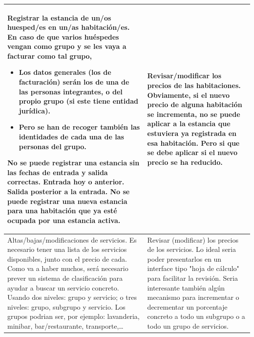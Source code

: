 \documentclass[spanish,12pt,a4paper,final,oneside]{book}
\begin{document}
\begin{longtable}{|p{7cm}|p{7cm}|}
\\ \hline

Registrar la estancia de un/os huesped/es en un/as habitación/es. 
\newline \newline
En caso de que varios huéspedes vengan como grupo y se les vaya a facturar como tal grupo,
\begin{itemize}
\item Los datos generales (los de facturación) serán los de una de las personas integrantes, o del propio grupo (si este tiene entidad jurídica).
\item Pero se han de recoger también las identidades de cada una de las personas del grupo.
\end{itemize}
\vspace{0.3cm}
No se puede registrar una estancia sin las fechas de entrada y salida correctas. Entrada hoy o anterior. Salida posterior a la entrada.
\newline \newline
No se puede registrar una nueva estancia para una habitación que ya esté ocupada por una estancia activa.

&
Revisar/modificar los precios de las habitaciones.
\newline \newline
Obviamente, si el nuevo precio de alguna habitación se incrementa, no se puede aplicar a la estancia que estuviera ya registrada en esa habitación. Pero si que se debe aplicar si el nuevo precio se ha reducido.


\\ \hline

Altas/bajas/modificaciones de servicios.
\newline \newline
Es necesario tener una lista de los servicios disponibles, junto con el precio de cada.
\newline \newline
Como va a haber muchos, será necesario prever un sistema de clasificación para ayudar a buscar un servicio concreto. Usando dos niveles: grupo y servicio; o tres niveles: grupo, subgrupo y servicio.
\newline
Los grupos podrian ser, por ejemplo: lavanderia, minibar, bar/restaurante, transporte,\ldots 

&

Revisar (modificar) los precios de los servicios.
\newline \newline
Lo ideal seria poder presentarlos en un interface tipo "hoja de cálculo" para facilitar la revisión.
\newline \newline
Seria interesante también algún mecanismo para incrementar o decrementar un porcentaje concreto a todo un subgrupo o a todo un grupo de servicios.


\end{longtable}
\end{document}
